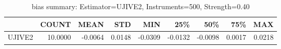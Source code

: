 \begin{table}[ht]
\centering
\caption{bias summary: Estimator=UJIVE2, Instruments=500, Strength=0.40}
\begin{tabular}{lrrrrrrrr}
\toprule
 & COUNT & MEAN & STD & MIN & 25\% & 50\% & 75\% & MAX \\
\midrule
UJIVE2 & 10.0000 & -0.0064 & 0.0148 & -0.0309 & -0.0132 & -0.0098 & 0.0017 & 0.0218 \\
\bottomrule
\end{tabular}
\end{table}
